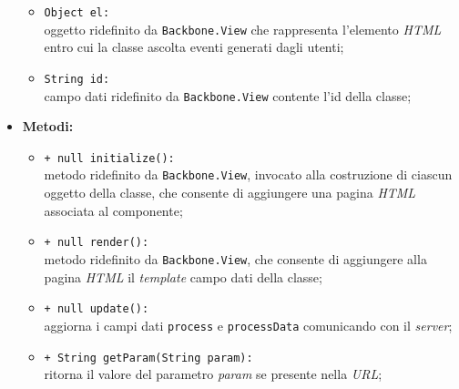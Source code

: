 \begin{flushleft}
\begin{itemize}
\begin{sloppypar}
\begin{itemize}
\item \texttt{Object el:}\\ oggetto ridefinito da \texttt{Backbone.View} che rappresenta l'elemento \textit{HTML} entro cui la classe ascolta eventi generati dagli utenti;
\item \texttt{String id:}\\ campo dati ridefinito da \texttt{Backbone.View} contente l'id della classe;
\end{itemize}
\end{sloppypar}
\item \textbf{Metodi:}
\begin{sloppypar}
\begin{itemize}
\item \texttt{+ null initialize():}\\ metodo ridefinito da \texttt{Backbone.View}, invocato alla costruzione di ciascun oggetto della classe, che consente di aggiungere una pagina \textit{HTML} associata al componente;
\item \texttt{+ null render():}\\ metodo ridefinito da \texttt{Backbone.View}, che consente di aggiungere alla pagina \textit{HTML} il \textit{template} campo dati della classe;
\item \texttt{+ null update():}\\ aggiorna i campi dati \texttt{process} e \texttt{processData} comunicando con il \textit{server};
\item \texttt{+ String getParam(String param):}\\ ritorna il valore del parametro \textit{param} se presente nella \textit{URL};
\end{itemize}
\end{sloppypar}
\end{itemize}
\end{flushleft}

